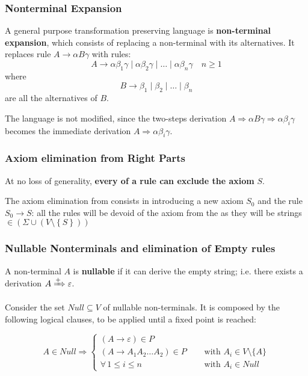 \documentclass[english]{article}
\begin{document}
\subsubsection{Nonterminal Expansion}
\label{sec:non-terminal-expansion}

A general purpose transformation preserving language is \textbf{non-terminal expansion}, which consists of replacing a non-terminal with its alternatives.
It replaces rule \(A \rightarrow \alpha B \gamma\) with rules:
\[ A \rightarrow \alpha \beta_1 \gamma \mid \alpha \beta_2 \gamma \mid \ldots \mid \alpha \beta_n \gamma \quad n \geq 1 \]
where
\[ B \rightarrow \beta_1 \mid \beta_2 \mid \ldots \mid \beta_n \] are all the alternatives of \(B\).

The language is not modified, since the two-steps derivation \(A \Rightarrow \alpha B \gamma \Rightarrow \alpha \beta_i \gamma\) becomes the immediate derivation \(A \Rightarrow \alpha \beta_i \gamma\).

\subsubsection{Axiom elimination from Right Parts}
\label{sec:axiom-elimination-from-right-parts}

At no loss of generality, \textbf{every \RP of a rule can exclude the axiom} \(S\).

The axiom elimination from \RP consists in introducing a new axiom \(S_0\) and the rule \(S_0 \rightarrow S\):
all the rules will be devoid of the axiom from the \RP as they will be strings \(\in \left( \Sigma \cup \left( V \setminus \left\{ S \right\} \right) \right)\)

\subsubsection{Nullable Nonterminals and elimination of Empty rules}
\label{sec:nullable-non-terminals-and-elimination-of-empty-rules}

A non-terminal \(A\) is \textbf{nullable} if it can derive the empty string;
i.e. there exists a derivation \(A \xRightarrow{+} \varepsilon\).

Consider the set \(\textit{Null} \subseteq V\) of nullable non-terminals.
It is composed by the following logical clauses, to be applied until a fixed point is reached:

\[
  A \in \textit{Null} \Rightarrow
  \begin{cases}
    (A \rightarrow \varepsilon) \in P                                                        \\
    (A \rightarrow A_1 A_2 \ldots A_2) \in P \quad & \text{ with } A_i \in V \setminus \{A\} \\
    \forall \, 1 \leq i \leq n \quad               & \text{ with } A_i \in \textit{Null}
  \end{cases}
\]
\end{document}
